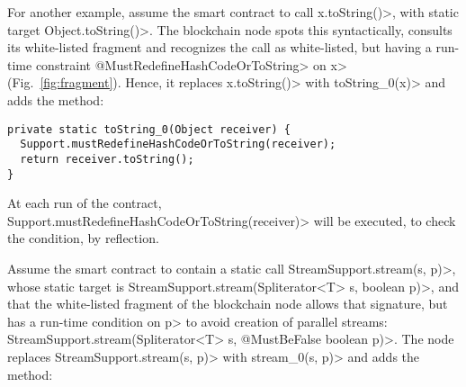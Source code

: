 

For another example, assume the smart contract to call
\<x.toString()>, with static target \<Object.toString()>.
The blockchain node spots this syntactically,
consults its white-listed fragment and recognizes the call as
white-listed, but having a run-time constraint \<@MustRedefineHashCodeOrToString> on
\<x> (Fig.~\ref{fig:fragment}).
Hence, it replaces \<x.toString()> with \<toString\_0(x)> and adds
the method:

{\small\begin{verbatim}
private static toString_0(Object receiver) {
  Support.mustRedefineHashCodeOrToString(receiver);
  return receiver.toString();
}
\end{verbatim}}

\noindent
At each run of the contract,
\<Support.mustRedefineHashCodeOrToString(receiver)> will be executed,
to check the condition, by reflection.

Assume the smart contract to contain a static call
\<StreamSupport.stream(s, p)>, whose static target is
\<StreamSupport.stream(Spliterator$\text{<}$T$\text{>}$ s, boolean p)>,
and that the white-listed fragment of the blockchain node allows that signature,
but has a run-time condition on \<p> to avoid creation of parallel streams:
\<StreamSupport.stream(Spliterator$\text{<}$T$\text{>}$ s, @MustBeFalse boolean p)>.
The node replaces \<StreamSupport.stream(s, p)> with \<stream\_0(s, p)> and adds
the method:

